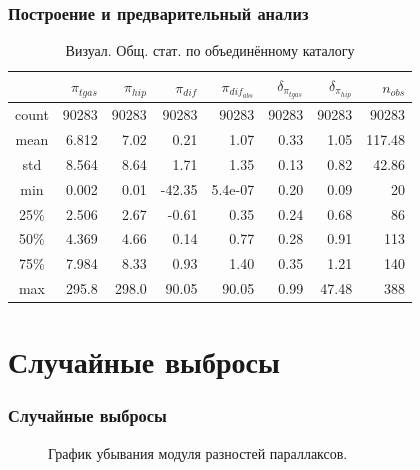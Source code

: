 \documentclass[14pt,aspectratio=43]{beamer}
\begin{document}
\begin{frame}[squeeze, shrink=5]
\frametitle{Построение и предварительный анализ}
\begin{table}[h!]
\caption{Визуал. Общ. стат. по объединённому каталогу}
\label{tabular:tgas_st}
\begin{tabular}{c|r|r|r|r|r|r|r}
\hline 	
&$\pi_{tgas}$&$\pi_{hip}$&$\pi_{dif}$&$\pi_{dif_{abs}}$&$\delta_{\pi_{tgas}}$&$\delta_{\pi_{hip}}$&$n_{obs}$\\
\hline
\hline 	
count&90283&90283&90283&90283&90283&90283&90283\\
\hline 
mean&6.812&7.02&0.21&1.07&0.33&1.05&117.48\\
std&8.564&8.64&1.71&1.35&0.13&0.82&42.86\\
min&0.002&0.01&-42.35&5.4e-07&0.20&0.09&20\\
25\%&2.506&2.67&-0.61&0.35&0.24&0.68&86\\
50\%&4.369&4.66&0.14&0.77&0.28&0.91&113\\
75\%&7.984&8.33&0.93&1.40&0.35&1.21&140\\
max&295.8&298.0&90.05&90.05&0.99&47.48&388\\
\end{tabular}
\end{table}

\end{frame}	

\section{Случайные выбросы}\label{sub:smthrs}

\begin{frame}[<alignment>]
\frametitle{Случайные выбросы}

\begin{figure}[h!]
\caption{График убывания модуля разностей параллаксов.}
\end{figure}

\end{frame}
\end{document}
